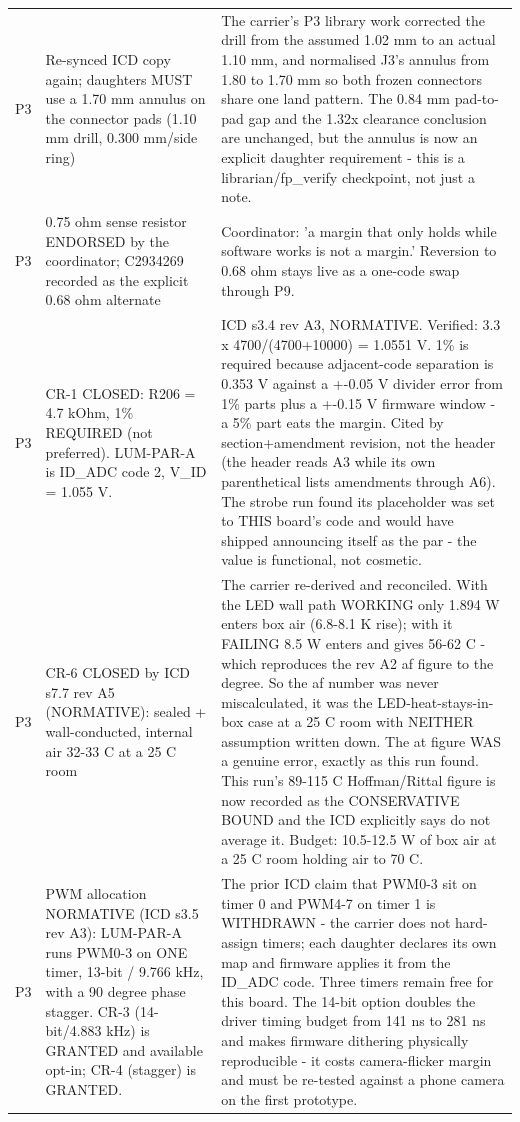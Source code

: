 \documentclass[11pt,a4paper]{article}
\begin{document}
{\begin{longtable}{lp{5.2cm}p{7.2cm}}
P3 & Re-synced ICD copy again; daughters MUST use a 1.70 mm annulus on the connector pads (1.10 mm drill, 0.300 mm/side ring) & The carrier's P3 library work corrected the drill from the assumed 1.02 mm to an actual 1.10 mm, and normalised J3's annulus from 1.80 to 1.70 mm so both frozen connectors share one land pattern. The 0.84 mm pad-to-pad gap and the 1.32x clearance conclusion are unchanged, but the annulus is now an explicit daughter requirement - this is a librarian/fp\_verify checkpoint, not just a note. \\
P3 & 0.75 ohm sense resistor ENDORSED by the coordinator; C2934269 recorded as the explicit 0.68 ohm alternate & Coordinator: 'a margin that only holds while software works is not a margin.' Reversion to 0.68 ohm stays live as a one-code swap through P9. \\
P3 & CR-1 CLOSED: R206 = 4.7 kOhm, 1\% REQUIRED (not preferred). LUM-PAR-A is ID\_ADC code 2, V\_ID = 1.055 V. & ICD s3.4 rev A3, NORMATIVE. Verified: 3.3 x 4700/(4700+10000) = 1.0551 V. 1\% is required because adjacent-code separation is 0.353 V against a +-0.05 V divider error from 1\% parts plus a +-0.15 V firmware window - a 5\% part eats the margin. Cited by section+amendment revision, not the header (the header reads A3 while its own parenthetical lists amendments through A6). The strobe run found its placeholder was set to THIS board's code and would have shipped announcing itself as the par - the value is functional, not cosmetic. \\
P3 & CR-6 CLOSED by ICD s7.7 rev A5 (NORMATIVE): sealed + wall-conducted, internal air 32-33 C at a 25 C room & The carrier re-derived and reconciled. With the LED wall path WORKING only 1.894 W enters box air (6.8-8.1 K rise); with it FAILING 8.5 W enters and gives 56-62 C - which reproduces the rev A2 af figure to the degree. So the af number was never miscalculated, it was the LED-heat-stays-in-box case at a 25 C room with NEITHER assumption written down. The at figure WAS a genuine error, exactly as this run found. This run's 89-115 C Hoffman/Rittal figure is now recorded as the CONSERVATIVE BOUND and the ICD explicitly says do not average it. Budget: 10.5-12.5 W of box air at a 25 C room holding air to 70 C. \\
P3 & PWM allocation NORMATIVE (ICD s3.5 rev A3): LUM-PAR-A runs PWM0-3 on ONE timer, 13-bit / 9.766 kHz, with a 90 degree phase stagger. CR-3 (14-bit/4.883 kHz) is GRANTED and available opt-in; CR-4 (stagger) is GRANTED. & The prior ICD claim that PWM0-3 sit on timer 0 and PWM4-7 on timer 1 is WITHDRAWN - the carrier does not hard-assign timers; each daughter declares its own map and firmware applies it from the ID\_ADC code. Three timers remain free for this board. The 14-bit option doubles the driver timing budget from 141 ns to 281 ns and makes firmware dithering physically reproducible - it costs camera-flicker margin and must be re-tested against a phone camera on the first prototype. \\

\end{longtable}}
\end{document}
